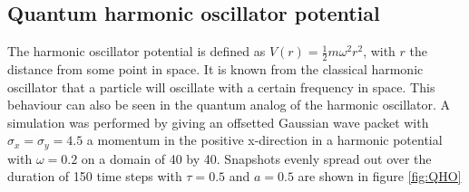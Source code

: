 \subsection*{Quantum harmonic oscillator potential}
The harmonic oscillator potential is defined as $V(r) = \frac{1}{2}m\omega^2r^2$, with $r$ the distance from some point in space. It is known from the classical harmonic oscillator that a particle will oscillate with a certain frequency in space. This behaviour can also be seen in the quantum analog of the harmonic oscillator. A simulation was performed by giving an offsetted Gaussian wave packet with $\sigma_x = \sigma_y = 4.5$ a momentum in the positive x-direction in a harmonic potential with $\omega = 0.2$ on a domain of 40 by 40. Snapshots evenly spread out over the duration of 150 time steps with $\tau = 0.5$ and $a = 0.5$ are shown in figure \ref{fig:QHO}
\def\arraystretch{0.6}%
\setlength\tabcolsep{0.5mm}
